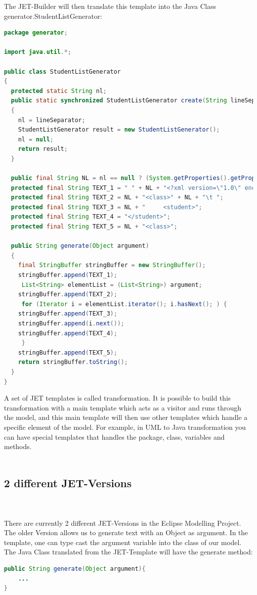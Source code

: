 The JET-Builder will then translate this template into the Java Class generator.StudentListGenerator:
\begin{lstlisting}[caption = the translated Java-Class, language = Java]
package generator;

import java.util.*;

public class StudentListGenerator
{
  protected static String nl;
  public static synchronized StudentListGenerator create(String lineSeparator)
  {
    nl = lineSeparator;
    StudentListGenerator result = new StudentListGenerator();
    nl = null;
    return result;
  }

  public final String NL = nl == null ? (System.getProperties().getProperty("line.separator")) : nl;
  protected final String TEXT_1 = " " + NL + "<?xml version=\"1.0\" encoding=\"UTF-8\"?>";
  protected final String TEXT_2 = NL + "<class>" + NL + "\t ";
  protected final String TEXT_3 = NL + "     <student>";
  protected final String TEXT_4 = "</student>";
  protected final String TEXT_5 = NL + "<class>";

  public String generate(Object argument)
  {
    final StringBuffer stringBuffer = new StringBuffer();
    stringBuffer.append(TEXT_1);
     List<String> elementList = (List<String>) argument; 
    stringBuffer.append(TEXT_2);
     for (Iterator i = elementList.iterator(); i.hasNext(); ) { 
    stringBuffer.append(TEXT_3);
    stringBuffer.append(i.next());
    stringBuffer.append(TEXT_4);
     } 
    stringBuffer.append(TEXT_5);
    return stringBuffer.toString();
  }
}

\end{lstlisting}


A set of JET templates is called transformation. It is possible to build this transformation with a main template which acts as a visitor and runs through the model, and this main template will then use other templates which handle a specific element of the model. For example, in UML to Java transformation you can have special templates that handles the package, class, variables and methods.\\\\

\subsection{2 different JET-Versions}\\\\
There are currently 2 different JET-Versions in the Eclipse Modelling Project. The older Version allows us to generate text with an Object as argument. In the template, one can type cast the argument variable into the class of our model. \\
The Java Class translated from the JET-Template will have the generate method: \\
\begin{lstlisting}[language=Java, caption=generate method translated from the JET-Template,
label=lst:jet_generate]
public String generate(Object argument){
	...
}
\end{lstlisting}

